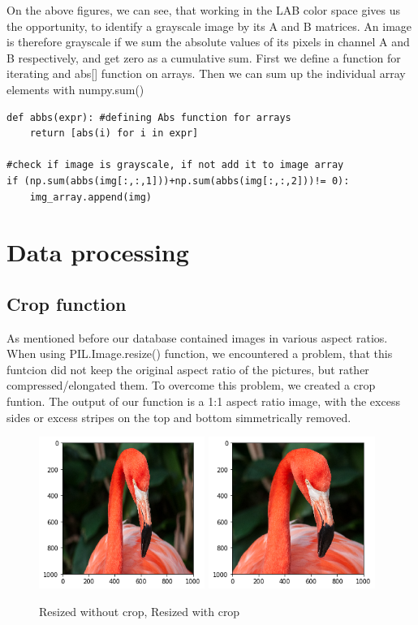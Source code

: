 \documentclass[12pt]{article}
\begin{document}
\noindent On the above figures, we can see, that working in the LAB color space gives us the opportunity, to identify a grayscale image by its A and B matrices. An image is therefore grayscale if we sum the absolute values of its pixels in channel A and B respectively, and get zero as a cumulative sum.
\newline 
\newline First we define a function for iterating and abs[] function on arrays. Then we can sum up the individual array elements with numpy.sum()

\begin{lstlisting}
def abbs(expr): #defining Abs function for arrays
	return [abs(i) for i in expr]
	
#check if image is grayscale, if not add it to image array
if (np.sum(abbs(img[:,:,1]))+np.sum(abbs(img[:,:,2]))!= 0): 
	img_array.append(img)
\end{lstlisting}

\section{Data processing}

\subsection{Crop function}
As mentioned before our database contained images in various aspect ratios. When using PIL.Image.resize() function, we encountered a problem, that this funtcion did not keep the original aspect ratio of the pictures, but rather compressed/elongated them. To overcome this problem, we created a crop funtion. The output of our function is a 1:1 aspect ratio image, with the excess sides or excess stripes on the top and bottom simmetrically removed.

\begin{figure}[H]
	\centering
	\captionsetup{justification=centering}
	\includegraphics[height=140pt]{flam_sm}
	\hspace{1cm}
	\includegraphics[height=140pt]{flam_crp}
	\caption{Resized without crop, Resized with crop}	
	\label{fig:flam_diff}
\end{figure}
\end{document}
